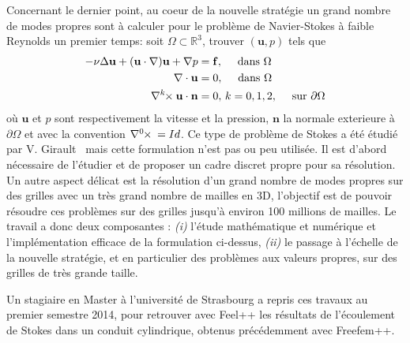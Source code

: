 \documentclass[12pt]{article}
\newcommand{\curlk}[1][k]{\ensuremath{\nabla^{#1}\hspace{-.3em}\times}\xspace}
\begin{document}
Concernant le dernier point, au coeur de la nouvelle stratégie un grand nombre
de modes propres sont à calculer pour le problème de Navier-Stokes à faible
Reynolds un premier temps: soit $\Omega
\subset \mathbb{R}^3$, trouver $(\mathbf{u},p)$ tels que
\begin{align}
  \label{eq:1}
  - \nu \Delta \mathbf{u} + (\mathbf{u} \cdot \nabla)\mathbf{u} + \nabla p &= \mathbf{f},\quad \mbox{ dans } \Omega\\
  \nabla \cdot \mathbf{u} &= 0,\quad \mbox{ dans } \Omega\\
  \curlk{} \mathbf{u} \cdot \mathbf{n} &= 0,\, k=0,1,2,\quad \mbox{ sur
  } \partial \Omega
\end{align}
où $\mathbf{u}$ et $p$ sont respectivement la vitesse et la pression,
$\mathbf{n}$ la normale exterieure à $\partial \Omega$ et avec la convention
$\curlk[0]{} = Id$. Ce type de problème de Stokes a été étudié par
V. Girault~\cite{girault90-1} mais cette formulation n'est pas ou peu
utilisée. Il est d'abord nécessaire de l'étudier et de proposer un cadre discret
propre pour sa résolution. Un autre aspect délicat est la résolution d'un grand
nombre de modes propres sur des grilles avec un très grand nombre de mailles en
3D, l'objectif est de pouvoir résoudre ces problèmes sur des grilles jusqu'à
environ 100 millions de mailles.  Le travail a donc deux composantes :
\textit{(i)} l'étude mathématique et numérique et l'implémentation efficace de
la formulation ci-dessus, \textit{(ii)} le passage à l'échelle de la nouvelle
stratégie, et en particulier des problèmes aux valeurs propres, sur des grilles
de très grande taille.



Un stagiaire en Master à l’université de Strasbourg a  repris ces travaux au
premier semestre 2014, pour retrouver avec Feel++ les résultats de l’écoulement
de Stokes dans un conduit cylindrique, obtenus précédemment avec Freefem++.
\end{document}
